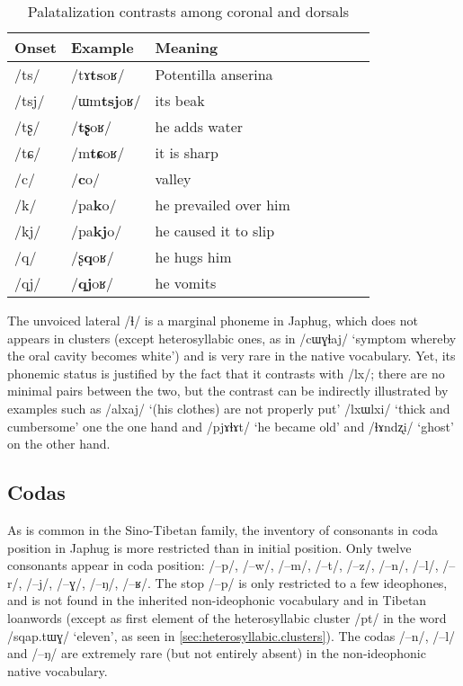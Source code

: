 \documentclass[oldfontcommands,oneside,a4paper,11pt]{article}
\newcommand{\ipa}[1]{{\phon/#1/}} %
\begin{document}
      		   \begin{table}
 \caption{Palatalization contrasts among coronal and dorsals } \label{tab:coronal.dorsal}  \centering
\begin{tabular}{llllllll}
\toprule		
Onset & Example & Meaning \\
\midrule
      \ipa{ts} &      \ipa{tɤ\textbf{ts}oʁ}  & Potentilla anserina \\
      \ipa{tsj} &     \ipa{ɯm\textbf{tsj}oʁ}  & its beak \\
      \ipa{tʂ} &      \ipa{\textbf{tʂ}oʁ}  & he adds water \\
      \ipa{tɕ} &      \ipa{m\textbf{tɕ}oʁ}  &it is sharp\\
      \ipa{c} &      \ipa{\textbf{c}o}  & valley \\
      \ipa{k} &      \ipa{pa\textbf{k}o}  & he prevailed over him \\
      \ipa{kj} &      \ipa{pa\textbf{kj}o}  & he caused it to slip \\
      \ipa{q} &      \ipa{ʂ\textbf{q}oʁ}  &he hugs him \\
      \ipa{qj} &      \ipa{\textbf{qj}oʁ}  & he vomits \\
      \bottomrule
\end{tabular}
\end{table}
 
The unvoiced lateral  \ipa{ɬ} is a marginal phoneme in Japhug, which does not appears in clusters (except heterosyllabic ones, as in \ipa{cɯɣɬaj} `symptom whereby the oral cavity becomes white') and is very rare in the native vocabulary. Yet, its phonemic status is justified by the fact that it contrasts with \ipa{lx}; there are no minimal pairs between the two, but the contrast can be indirectly illustrated by examples such as \ipa{alxaj} `(his clothes) are not properly put' \ipa{lxɯlxi} `thick and cumbersome' one the one hand and \ipa{pjɤɬɤt} `he became old' and \ipa{ɬɤndʐi} `ghost' on the other hand.





      \subsection{Codas} \label{sec:coda}
   As is common in the Sino-Tibetan family, the inventory of consonants in coda position in Japhug is more restricted than in initial position.  Only twelve   consonants appear in coda position:  \ipa{--p}, \ipa{--w}, \ipa{--m}, \ipa{--t}, \ipa{--z}, \ipa{--n}, \ipa{--l}, \ipa{--r}, \ipa{--j}, \ipa{--ɣ}, \ipa{--ŋ}, \ipa{--ʁ}. The stop \ipa{--p} is only restricted to a few ideophones, and is not found in the inherited non-ideophonic vocabulary and in Tibetan loanwords (except as first element of the heterosyllabic cluster \ipa{pt} in the word \ipa{sqap.tɯɣ} `eleven', as seen in \ref{sec:heterosyllabic.clusters}). The codas \ipa{--n}, \ipa{--l} and \ipa{--ŋ} are extremely rare (but not entirely absent) in the non-ideophonic native vocabulary. 
    
\end{document}
